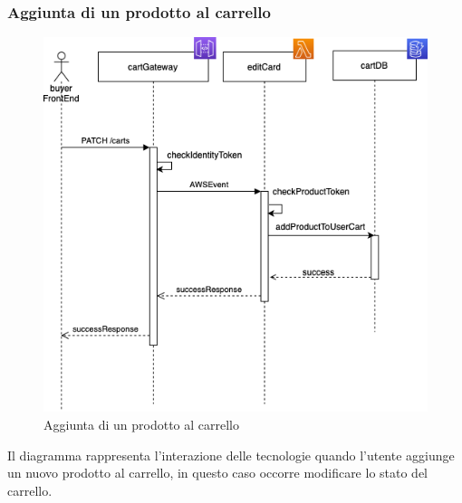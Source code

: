 \subsubsection{Aggiunta di un prodotto al carrello}
\begin{figure}[H]
	\centering
	\includegraphics[scale=0.5]{Immagini/Backend/AggiuntaProdottoAlCarrello.png}
	\caption{Aggiunta di un prodotto al carrello}
	\label{fig:DiagrammaCarrello}
\end{figure}
Il diagramma rappresenta l'interazione delle tecnologie quando l'utente aggiunge un nuovo prodotto al carrello, in questo caso occorre modificare lo stato del carrello.
